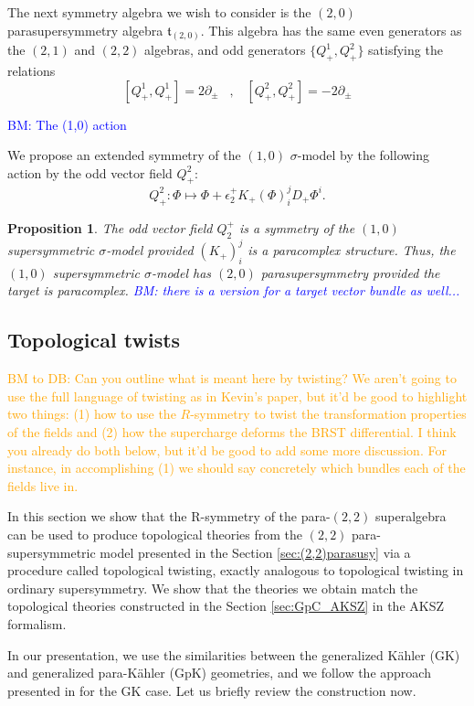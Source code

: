 \documentclass[letterpaper,12pt]{article}
\newtheorem{proposition}[theorem]{Proposition}
\theoremstyle{definition}
\theoremstyle{remark}
\theoremstyle{examples}
\def\brian{\textcolor{blue}{BM: }\textcolor{blue}}
\def\btd{\textcolor{orange}{BM to DB: }\textcolor{orange}}
\begin{document}
The next symmetry algebra we wish to consider is the $(2,0)$ parasupersymmetry algebra $\mathfrak{t}_{(2,0)}$. 
This algebra has the same even generators as the $(2,1)$ and $(2,2)$ algebras, and odd generators $\{Q^1_+, Q^2_+\}$ satisfying the relations
\[
[Q^1_+, Q^1_+] =  2 \partial_\pm \;\;\; , \;\;\; [Q^2_+, Q^2_+] = - 2 \partial_\pm
\]

\brian{The (1,0) action}

We propose an extended symmetry of the $(1,0)$ $\sigma$-model by the following action by the odd vector field $Q_+^2$:
\[
Q^2_+ : \Phi \mapsto \Phi + \epsilon_2^+ K_+(\Phi)^j_i D_+ \Phi^i .
\]

\begin{proposition}
The odd vector field $Q_2^+$ is a symmetry of the $(1,0)$ supersymmetric $\sigma$-model provided $(K_+)^{j}_i$ is a paracomplex structure. 
Thus, the $(1,0)$ supersymmetric $\sigma$-model has $(2,0)$ parasupersymmetry provided the target is paracomplex. \brian{there is a version for a target vector bundle as well...}
\end{proposition}

\subsection{Topological twists}\label{sec:toptwist}

\btd{Can you outline what is meant here by twisting? We aren't going to use the full language of twisting as in Kevin's paper, but it'd be good to highlight two things: (1) how to use the $R$-symmetry to twist the transformation properties of the fields and (2) how the supercharge deforms the BRST differential.
I think you already do both below, but it'd be good to add some more discussion. 
For instance, in accomplishing (1) we should say concretely which bundles each of the fields live in.}

In this section we show that the R-symmetry of the para-$(2,2)$ superalgebra can be used to produce topological theories from the $(2,2)$ para-supersymmetric model presented in the Section \ref{sec:(2,2)parasusy} via a procedure called topological twisting, exactly analogous to topological twisting in ordinary supersymmetry. We show that the theories we obtain match the topological theories constructed in the Section \ref{sec:GpC_AKSZ} in the AKSZ formalism. 

In our presentation, we use the similarities between the generalized K\"{a}hler (GK) and generalized para-K\"{a}hler (GpK) geometries, and we follow the approach presented in \cite{Kapustin:2004gv} for the GK case. Let us briefly review the construction now.
\end{document}
